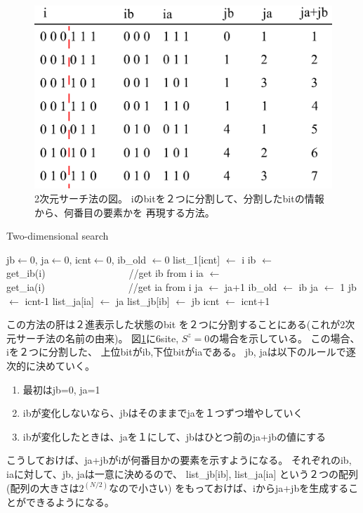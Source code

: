 \documentclass[prb,aps,showpacs,preprint,nofootinbib]{revtex4}
\newcommand{\lef}{\leftarrow}
\begin{document}
\begin{figure}[h!]
        \begin{center}
                \includegraphics[width=12cm,clip]{2DSearch.eps}
        \end{center}
\caption{2次元サーチ法の図。
iのbitを２つに分割して、分割したbitの情報から、何番目の要素かを
再現する方法。}
\label{fig:2DSearch}
\end{figure}


\begin{algorithm}                      
\caption{Two-dimensional search}         
\begin{algorithmic}                  
\STATE jb$\lef 0$, ja$\lef 0$, icnt$\lef 0$, ib\_old $\lef 0$
\STATE list\_1[icnt] $\lef$ i
\STATE ib $\lef$ get\_ib(i)~~~~~~~~~~~~~~~~~//get ib from i
\STATE ia $\lef$ get\_ia(i)~~~~~~~~~~~~~~~~~//get ia from i
  \STATE ja $\lef$ ja+1
  \ELSE
  \STATE ib\_old $\lef$ ib
  \STATE ja $\lef$ 1
  \STATE jb $\lef$ icnt-1
  \ENDIF
\STATE  list\_ja[ia] $\lef$ ja
\STATE  list\_jb[ib] $\lef$ jb
\STATE  icnt $\lef$ icnt+1
\ENDIF
\ENDFOR
\end{algorithmic}
\label{alg:2DSearch}
\end{algorithm}

この方法の肝は２進表示した状態のbit
を２つに分割することにある(これが2次元サーチ法の名前の由来)。
図\ref{fig:2DSearch}に6site, $S^{z}=0$の場合を示している。
この場合、iを２つに分割した、
上位bitがib,下位bitがiaである。
jb, jaは以下のルールで逐次的に決めていく。
\begin{enumerate}
\item 最初はjb=0, ja=1
\item ibが変化しないなら、jbはそのままでjaを１つずつ増やしていく
\item ibが変化したときは、jaを１にして、jbはひとつ前のja+jbの値にする
\end{enumerate}
こうしておけば、ja+jbがiが何番目かの要素を示すようになる。
それぞれのib, iaに対して、jb, jaは一意に決めるので、
list\_jb[ib], list\_ja[ia]
という２つの配列(配列の大きさは$2^(N/2)$なので小さい)
をもっておけば、iからja+jbを生成することができるようになる。
\end{document}
